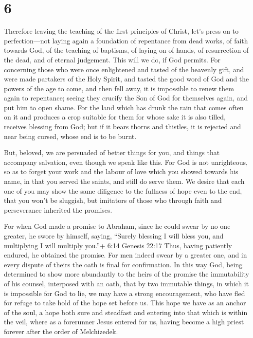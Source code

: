 \hypertarget{section-5}{%
\section{6}\label{section-5}}

 Therefore leaving the teaching of the first principles of
Christ, let's press on to perfection---not laying again a foundation of
repentance from dead works, of faith towards God,  of the
teaching of baptisms, of laying on of hands, of resurrection of the
dead, and of eternal judgement.  This will we do, if God
permits.  For concerning those who were once enlightened and
tasted of the heavenly gift, and were made partakers of the Holy Spirit,
 and tasted the good word of God and the powers of the age
to come,  and then fell away, it is impossible to renew them
again to repentance; seeing they crucify the Son of God for themselves
again, and put him to open shame.  For the land which has
drunk the rain that comes often on it and produces a crop suitable for
them for whose sake it is also tilled, receives blessing from God;
 but if it bears thorns and thistles, it is rejected and
near being cursed, whose end is to be burnt.

 But, beloved, we are persuaded of better things for you,
and things that accompany salvation, even though we speak like this.
 For God is not unrighteous, so as to forget your work and
the labour of love which you showed towards his name, in that you served
the saints, and still do serve them.  We desire that each
one of you may show the same diligence to the fullness of hope even to
the end,  that you won't be sluggish, but imitators of
those who through faith and perseverance inherited the promises.

 For when God made a promise to Abraham, since he could
swear by no one greater, he swore by himself,  saying,
``Surely blessing I will bless you, and multiplying I will multiply
you.''+ 6:14 Genesis 22:17  Thus, having patiently endured,
he obtained the promise.  For men indeed swear by a greater
one, and in every dispute of theirs the oath is final for confirmation.
 In this way God, being determined to show more abundantly
to the heirs of the promise the immutability of his counsel, interposed
with an oath,  that by two immutable things, in which it is
impossible for God to lie, we may have a strong encouragement, who have
fled for refuge to take hold of the hope set before us. 
This hope we have as an anchor of the soul, a hope both sure and
steadfast and entering into that which is within the veil, 
where as a forerunner Jesus entered for us, having become a high priest
forever after the order of Melchizedek.


